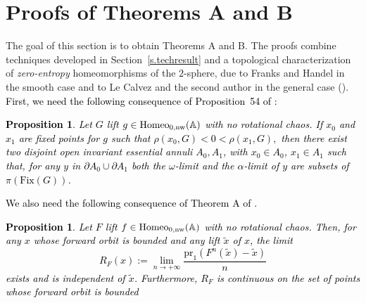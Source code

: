 \documentclass[12pt,a4paper]{amsart}
\newtheorem{prop}[thm]{Proposition}
\theoremstyle{definition}
\theoremstyle{remark}
\newcommand{\A}{\mathbb{A}}
\begin{document}
 





\section{Proofs of Theorems A and B}\label{s.conservative}
The goal of this section is to obtain Theorems A and B. The proofs combine techniques developed in Section~\ref{s.techresult} and a
topological characterization of \emph{zero-entropy}
homeomorphisms of the $2$-sphere, due to Franks and Handel in the smooth case and
to Le Calvez and the second author in the general case (\cite{frankshandel, forcing}).
\textcolor{black}{First, we need the following consequence of Proposition~54 of \cite{forcing}:}
\textcolor{black}{
\begin{prop}\label{p.54forcing}
Let $G$ lift $g\in \mathrm{\normalfont{Homeo}}_{0,\mathrm{\normalfont{nw}}}(\A)$ with no rotational chaos. If $x_0$ and $x_1$ are fixed points for $g$ such that $\rho(x_0,G)<0<\rho(x_1,G),$ then there exist two disjoint open invariant essential annuli $A_0, A_1$, with $x_0\in A_0$, $x_1\in A_1$ such that, for any $y$ in $\partial A_0\cup\partial A_1$ both the $\omega$-limit and the $\alpha$-limit of $y$ are subsets of $\pi(\mathrm{Fix}(G))$.
\end{prop}}

\textcolor{black}{We also need the following consequence of Theorem A of \cite{lecalveztal}.
\begin{prop}\label{p.teoADuke}
Let $F$ lift $f\in \mathrm{\normalfont{Homeo}}_{0,\mathrm{\normalfont{nw}}}(\A)$ with no rotational chaos. Then, for any $x$ whose forward orbit is bounded and any lift $\widetilde x$ of $x$, the limit  
$$R_F(x):=\lim_{n\to+\infty}\frac{\mathrm{pr}_1( F^n(\widetilde x)-\widetilde x)}{n}$$
exists and is independent of $\widetilde x$. Furthermore, $R_F$ is continuous on the set of points whose forward orbit is bounded
\end{prop}}
\end{document}
